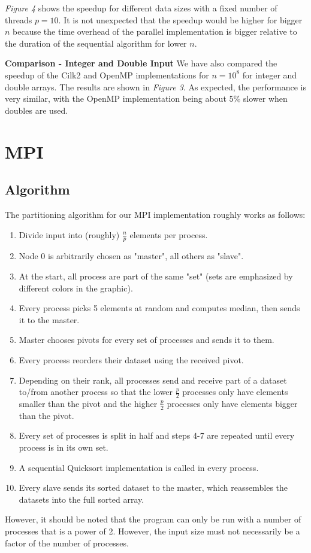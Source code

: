 \documentclass[12pt,a4paper]{article}
\begin{document}
\emph{Figure 4} shows the speedup for different data sizes with a fixed number of threads $p=10$. It is not unexpected that the speedup would be higher for bigger $n$ because the time overhead of the parallel implementation is bigger relative to the duration of the sequential algorithm for lower $n$.\newline

\noindent\textbf{Comparison - Integer and Double Input}\newline
We have also compared the speedup of the Cilk2 and OpenMP implementations for $n=10^{8}$ for integer and double arrays. The results are shown in \emph{Figure 3}. As expected, the performance is very similar, with the OpenMP implementation being about 5\% slower when doubles are used.
\section{MPI}
\subsection{Algorithm}
The partitioning algorithm for our MPI implementation roughly works as follows:
\begin{enumerate}
	\item Divide input into (roughly) $\frac{n}{p}$ elements per process.
	\item Node 0 is arbitrarily chosen as "master", all others as "slave".
	\item At the start, all process are part of the same "set" (sets are emphasized by different colors in the graphic).
	\item Every process picks 5 elements at random and computes median, then sends it to the master.
	\item Master chooses pivots for every set of processes and sends it to them.
	\item Every process reorders their dataset using the received pivot.
	\item Depending on their rank, all processes send and receive part of a dataset to/from another process so that the lower $\frac{p}{2}$ processes only have elements smaller than the pivot and the higher $\frac{p}{2}$ processes only have elements bigger than the pivot.
	\item Every set of processes is split in half and steps 4-7 are repeated until every process is in its own set.
	\item A sequential Quicksort implementation is called in every process.
	\item Every slave sends its sorted dataset to the master, which reassembles the datasets into the full sorted array.
\end{enumerate}
However, it should be noted that the program can only be run with a number of processes that is a power of 2. However, the input size must not necessarily be a factor of the number of processes. 
\end{document}
